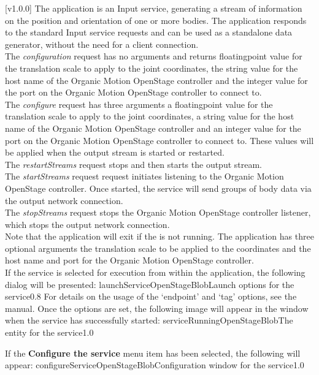 [v1.0.0]
The  application is an Input service,
generating a stream of information on the position and orientation of one or more bodies.
The application responds to the standard Input service requests and can be used as a
standalone data generator, without the need for a client connection.\\

The \emph{configuration} request has no arguments and returns floating\longDash{}point
value for the translation scale to apply to the joint coordinates, the string value for
the host name of the Organic Motion OpenStage controller and the integer value for the
port on the Organic Motion OpenStage controller to connect to.\\

The \emph{configure} request has three arguments \longDash{} a floating\longDash{}point
value for the translation scale to apply to the joint coordinates, a string value for
the host name of the Organic Motion OpenStage controller and an integer value for the port
on the Organic Motion OpenStage controller to connect to.
These values will be applied when the output stream is started or restarted.\\ 

The \emph{restartStreams} request stops and then starts the output stream.\\

The \emph{startStreams} request request initiates listening to the Organic Motion
OpenStage controller.
Once started, the service will send groups of body data via the output \yarp{} network
connection.\\

The \emph{stopStreams} request stops the Organic Motion OpenStage controller listener,
which stops the output \yarp{} network connection.\\ 

Note that the application will exit if the \emph{\RS} is not running.
The application has three optional arguments \longDash{} the translation scale to be
applied to the coordinates and the host name and port for the Organic Motion OpenStage
controller.
\insertAppParameters
\insertTagDescription{\OSBI}
\insertInputServiceComment\\

\insertStandardServiceCommands
\secondaryEnd
{}
If the service is selected for execution from within the \emph{\MMMU} application, the
following dialog will be presented:
%
{launchServiceOpenStageBlob}{Launch options for the \emph{\OSBI} service}{0.8}
\condPage{}
For details on the usage of the `endpoint' and `tag' options, see the \emph{\MMMU} manual.
Once the options are set, the following image will appear in the \emph{\MMMU} window when
the service has successfully started:
%
{serviceRunningOpenStageBlob}{The \emph{\MMMU} entity for the \emph{\OSBI} service}{1.0}

If the \textbf{Configure the service} menu item has been selected, the following will
appear:
%
{configureServiceOpenStageBlob}{Configuration window for the \emph{\OSBI} service}{1.0}
\secondaryEnd
\primaryEnd{}
